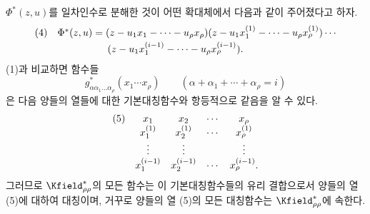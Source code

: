 
$\Phi^*(z,u)$를 일차인수로 분해한 것이 어떤 확대체에서 다음과 같이 주어졌다고 하자.
\[
\begin{array}{@{}l@{\quad}l@{}}
(4)& \Phi^*(z,u)=(z-u_1x_1-\cdots-u_\rho x_\rho)(z-u_1x_1^{(1)}-\cdots-u_\rho x_\rho^{(1)})\cdots\\[0.25em]
& \qquad\qquad\quad (z-u_1x_1^{(i-1)}-\cdots-u_\rho x_\rho^{(i-1)}).
\end{array}
\]
(1)과 비교하면 함수들
\[
g^*_{\alpha\alpha_1\ldots\alpha_\rho}(x_1\cdots x_\rho)\qquad(\alpha+\alpha_1+\cdots+\alpha_\rho=i)
\]
은 다음 양들의 열들에 대한 기본대칭함수와 항등적으로 같음을 알 수 있다.
\[
\begin{array}{@{}l@{\quad}cccc@{}}
(5)&x_1&x_2&\cdots&x_\rho\\
&x_1^{(1)}&x_2^{(1)}&\cdots&x_\rho^{(1)}\\
&\vdots&\vdots&&\vdots\\
&x_1^{(i-1)}&x_2^{(i-1)}&\cdots&x_\rho^{(i-1)}.
\end{array}
\]
그러므로 $\Kfield^*_{\rho\rho}$의 모든 함수는 이 기본대칭함수들의 유리 결합으로서 양들의 열 (5)에 대하여 대칭이며, 거꾸로 양들의 열 (5)의 모든 대칭함수는 $\Kfield^*_{\rho\rho}$에 속한다.
